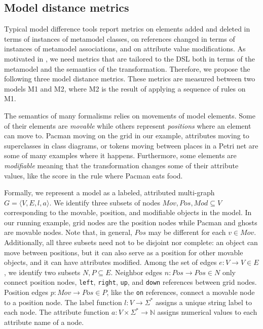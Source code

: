 
\subsection{Model distance metrics}

Typical model difference tools report metrics on elements added and deleted in terms of instances of metamodel classes, on references changed in terms of instances of metamodel associations, and on attribute value modifications.
As motivated in , we need metrics that are tailored to the DSL both in terms of the metamodel and the semantics of the transformation.
Therefore, we propose the following three model distance metrics.
These metrics are measured between two models M1 and M2, where M2 is the result of applying a sequence of rules on M1.

The semantics of many formalisms relies on movements of model elements.
Some of their elements are \emph{movable} while others represent \emph{positions} where an element can move to.
Pacman moving on the grid in our example, attributes moving to superclasses in class diagrams, or tokens moving between places in a Petri net are some of many examples where it happens.
Furthermore, some elements are \emph{modifiable} meaning that the transformation changes some of their attribute values, like the score in the rule where Pacman eats food.

Formally, we represent a model as a labeled, attributed multi-graph $G=\langle V,E,l,a \rangle$.
We identify three subsets of nodes $Mov,Pos,Mod \subseteq V$ corresponding to the movable, position, and modifiable objects in the model.
In our running example, grid nodes are the position nodes while Pacman and ghosts are movable nodes.
Note that, in general, $Pos$ may be different for each $v \in Mov$.
Additionally, all three subsets need not to be disjoint nor complete: an object can move between positions, but it can also serve as a position for other movable objects, and it can have attributes modified.
Among the set of edges $e:V \rightarrow V \in E$, we identify two subsets $N,P \subseteq E$.
Neighbor edges $n: Pos \rightarrow Pos \in N$ only connect position nodes, \eg \texttt{left}, \texttt{right}, \texttt{up}, and \texttt{down} references between grid nodes.
Position edges $p: Mov \rightarrow Pos \in P$, like the \texttt{on} references, connect a movable node to a position node.
The label function $l:V \rightarrow \Sigma^*$ assigns a unique string label to each node.
The attribute function $a:V \times \Sigma^* \rightarrow \mathbb{N}$ assigns numerical values to each attribute name of a node.

